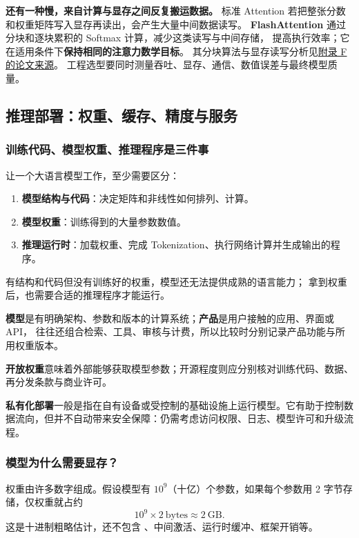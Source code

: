 \textbf{还有一种慢，来自计算与显存之间反复搬运数据。}
标准 Attention 若把整张分数和权重矩阵写入显存再读出，会产生大量中间数据读写。
\textbf{FlashAttention} 通过分块和逐块累积的 Softmax 计算，减少这类读写与中间存储，
提高执行效率；它在适用条件下\textbf{保持相同的注意力数学目标}。
其分块算法与显存读写分析见\hyperref[source:flash-attention]{附录 F 的论文来源}。
工程选型要同时测量吞吐、显存、通信、数值误差与最终模型质量。

\subsection{推理部署：权重、缓存、精度与服务}
\subsubsection*{训练代码、模型权重、推理程序是三件事}

让一个大语言模型工作，至少需要区分：
\begin{enumerate}
\item \textbf{模型结构与代码}：决定矩阵和非线性如何排列、计算。
\item \textbf{模型权重}：训练得到的大量参数数值。
\item \textbf{推理运行时}：加载权重、完成 Tokenization、执行网络计算并生成输出的程序。
\end{enumerate}
有结构和代码但没有训练好的权重，模型还无法提供成熟的语言能力；
拿到权重后，也需要合适的推理程序才能运行。

\textbf{模型}是有明确架构、参数和版本的计算系统；\textbf{产品}是用户接触的应用、界面或 API，
往往还组合检索、工具、审核与计费，所以比较时分别记录产品功能与所用权重版本。

\textbf{开放权重}意味着外部能够获取模型参数；开源程度则应分别核对训练代码、数据、再分发条款与商业许可。

\textbf{私有化部署}一般是指在自有设备或受控制的基础设施上运行模型。它有助于控制数据流向，但并不自动带来安全保障：仍需考虑访问权限、日志、模型许可和升级流程。

\subsubsection*{模型为什么需要显存？}

权重由许多数字组成。假设模型有 $10^9$（十亿）个参数，如果每个参数用 2 字节存储，仅权重就占约
\[
10^9\times2\ \text{bytes}\approx2\ \text{GB}.
\]
这是十进制粗略估计，还不包含 、中间激活、运行时缓冲、框架开销等。

